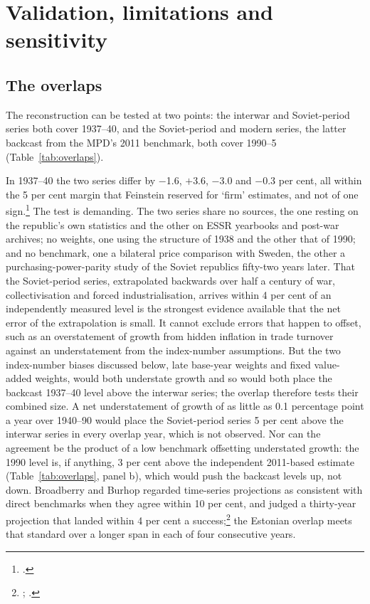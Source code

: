 \section{Validation, limitations and sensitivity}
\label{sec:limitations}

\subsection{The overlaps}

The reconstruction can be tested at two points: the interwar and Soviet-period series both cover 1937--40, and the Soviet-period and modern series, the latter backcast from the MPD's 2011 benchmark, both cover 1990--5 (Table~\ref{tab:overlaps}).



In 1937--40 the two series differ by $-$1.6, $+$3.6, $-$3.0 and $-$0.3 per cent, all within the 5 per cent margin that Feinstein reserved for `firm' estimates, and not of one sign.\footnote{\autocite[21]{feinstein1972}.} The test is demanding. The two series share no sources, the one resting on the republic's own statistics and the other on ESSR yearbooks and post-war archives; no weights, one using the structure of 1938 and the other that of 1990; and no benchmark, one a bilateral price comparison with Sweden, the other a purchasing-power-parity study of the Soviet republics fifty-two years later. That the Soviet-period series, extrapolated backwards over half a century of war, collectivisation and forced industrialisation, arrives within 4 per cent of an independently measured level is the strongest evidence available that the net error of the extrapolation is small. It cannot exclude errors that happen to offset, such as an overstatement of growth from hidden inflation in trade turnover against an understatement from the index-number assumptions. But the two index-number biases discussed below, late base-year weights and fixed value-added weights, would both understate growth and so would both place the backcast 1937--40 level above the interwar series; the overlap therefore tests their combined size. A net understatement of growth of as little as 0.1 percentage point a year over 1940--90 would place the Soviet-period series 5 per cent above the interwar series in every overlap year, which is not observed. Nor can the agreement be the product of a low benchmark offsetting understated growth: the 1990 level is, if anything, 3 per cent above the independent 2011-based estimate (Table~\ref{tab:overlaps}, panel b), which would push the backcast levels up, not down. Broadberry and Burhop regarded time-series projections as consistent with direct benchmarks when they agree within 10 per cent, and judged a thirty-year projection that landed within 4 per cent a success;\footnote{\autocite[323--6, 329]{broad2007}; \autocite[933]{broad2008}.} the Estonian overlap meets that standard over a longer span in each of four consecutive years.


